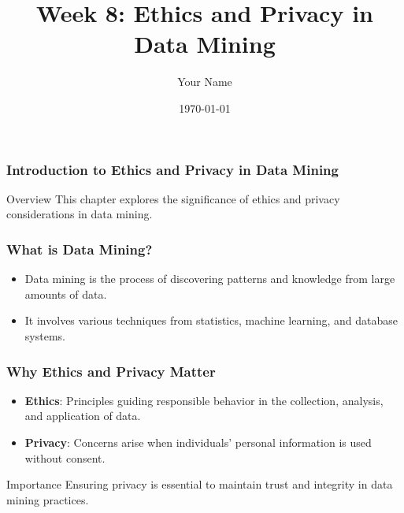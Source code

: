 \documentclass{beamer}
\title{Week 8: Ethics and Privacy in Data Mining}
\author{Your Name}
\institute{Your Institution}
\date{\today}
\begin{document}
\frame{\titlepage}

\begin{frame}[fragile]
    \frametitle{Introduction to Ethics and Privacy in Data Mining}
    \begin{block}{Overview}
        This chapter explores the significance of ethics and privacy considerations in data mining. 
    \end{block}
\end{frame}

\begin{frame}[fragile]
    \frametitle{What is Data Mining?}
    \begin{itemize}
        \item Data mining is the process of discovering patterns and knowledge from large amounts of data.
        \item It involves various techniques from statistics, machine learning, and database systems.
    \end{itemize}
\end{frame}

\begin{frame}[fragile]
    \frametitle{Why Ethics and Privacy Matter}
    \begin{itemize}
        \item \textbf{Ethics}: Principles guiding responsible behavior in the collection, analysis, and application of data.
        \item \textbf{Privacy}: Concerns arise when individuals' personal information is used without consent.
    \end{itemize}
    \begin{block}{Importance}
        Ensuring privacy is essential to maintain trust and integrity in data mining practices.
    \end{block}
\end{frame}
\end{document}
